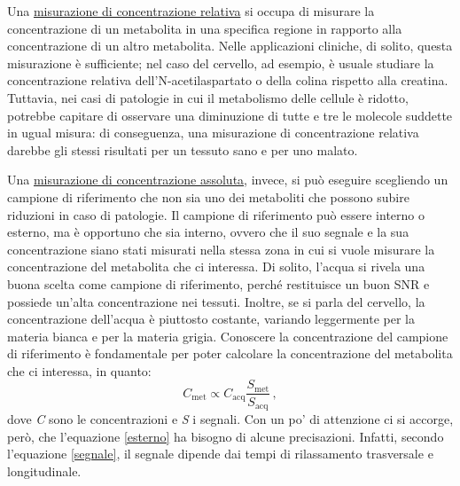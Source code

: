 \documentclass{report}
\renewcommand{\eqref}[1]{equazione \ref{#1}}
\numberwithin{equation}{section}
\numberwithin{figure}{section}
\begin{document}
Una \underline{misurazione di concentrazione relativa} si occupa di misurare la concentrazione di un metabolita in una specifica regione in rapporto alla concentrazione di un altro metabolita. Nelle applicazioni cliniche, di solito, questa misurazione è sufficiente; nel caso del cervello, ad esempio, è usuale studiare la concentrazione relativa dell'N-acetilaspartato o della colina rispetto alla creatina. Tuttavia, nei casi di patologie in cui il metabolismo delle cellule è ridotto, potrebbe capitare di osservare una diminuzione di tutte e tre le molecole suddette in ugual misura: di conseguenza, una misurazione di concentrazione relativa darebbe gli stessi risultati per un tessuto sano e per uno malato.

Una \underline{misurazione di concentrazione assoluta}, invece, si può eseguire scegliendo un campione di riferimento che non sia uno dei metaboliti che possono subire riduzioni in caso di patologie. Il campione di riferimento può essere interno o esterno, ma è opportuno che sia interno, ovvero che il suo segnale e la sua concentrazione siano stati misurati nella stessa zona in cui si vuole misurare la concentrazione del metabolita che ci interessa. Di solito, l'acqua si rivela una buona scelta come campione di riferimento, perché restituisce un buon SNR e possiede un'alta concentrazione nei tessuti. Inoltre, se si parla del cervello, la concentrazione dell'acqua è piuttosto costante, variando leggermente per la materia bianca e per la materia grigia. Conoscere la concentrazione del campione di riferimento è fondamentale per poter calcolare la concentrazione del metabolita che ci interessa, in quanto:
\begin{equation}
    C_\mathrm{met} \propto C_\mathrm{acq} \frac{S_\mathrm{met}}{S_\mathrm{acq}}\,,
    \label{esterno}
\end{equation}
dove \textit{C} sono le concentrazioni e \textit{S} i segnali. Con un po' di attenzione ci si accorge, però, che l'\eqref{esterno} ha bisogno di alcune precisazioni. Infatti, secondo l'\eqref{segnale}, il segnale dipende dai tempi di rilassamento trasversale e longitudinale.
\end{document}
